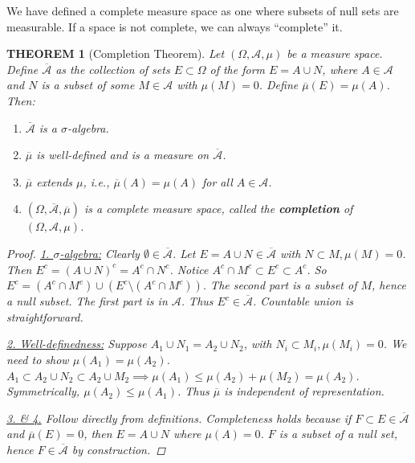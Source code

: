 \documentclass[12pt]{article}
\theoremstyle{blueplain}
\newtheorem{theorem}{THEOREM}[section]
\theoremstyle{bluedef}
\theoremstyle{blueremark}
\numberwithin{equation}{section}
\begin{document}
We have defined a complete measure space as one where subsets of null sets are measurable. If a space is not complete, we can always ``complete'' it.

\begin{theorem}[Completion Theorem]
  Let $(\Omega, \mathcal{A}, \mu)$ be a measure space. Define $\overline{\mathcal{A}}$ as the collection of sets $E \subset \Omega$ of the form $E = A \cup N$, where $A \in \mathcal{A}$ and $N$ is a subset of some $M \in \mathcal{A}$ with $\mu(M) = 0$.
  Define $\overline{\mu}(E) = \mu(A)$.
  Then:
  \begin{enumerate}
    \item $\overline{\mathcal{A}}$ is a $\sigma$-algebra.
    \item $\overline{\mu}$ is well-defined and is a measure on $\overline{\mathcal{A}}$.
    \item $\overline{\mu}$ extends $\mu$, i.e., $\overline{\mu}(A) = \mu(A)$ for all $A \in \mathcal{A}$.
    \item $(\Omega, \overline{\mathcal{A}}, \overline{\mu})$ is a complete measure space, called the \textbf{completion} of $(\Omega, \mathcal{A}, \mu)$.
  \end{enumerate}

  \begin{proof}
    \underline{1. $\sigma$-algebra:}
    Clearly $\emptyset \in \overline{\mathcal{A}}$.
    Let $E = A \cup N \in \overline{\mathcal{A}}$ with $N \subset M, \mu(M)=0$. Then $E^c = (A \cup N)^c = A^c \cap N^c$.
    Notice $A^c \cap M^c \subset E^c \subset A^c$.
    So $E^c = (A^c \cap M^c) \cup (E^c \setminus (A^c \cap M^c))$.
    The second part is a subset of $M$, hence a null subset. The first part is in $\mathcal{A}$. Thus $E^c \in \overline{\mathcal{A}}$.
    Countable union is straightforward.

    \underline{2. Well-definedness:}
    Suppose $A_1 \cup N_1 = A_2 \cup N_2$, with $N_i \subset M_i, \mu(M_i)=0$.
    We need to show $\mu(A_1) = \mu(A_2)$.
    $A_1 \subset A_2 \cup N_2 \subset A_2 \cup M_2 \implies \mu(A_1) \leq \mu(A_2) + \mu(M_2) = \mu(A_2)$.
    Symmetrically, $\mu(A_2) \leq \mu(A_1)$. Thus $\overline{\mu}$ is independent of representation.

    \underline{3. \& 4.} Follow directly from definitions. Completeness holds because if $F \subset E \in \overline{\mathcal{A}}$ and $\overline{\mu}(E)=0$, then $E = A \cup N$ where $\mu(A)=0$. $F$ is a subset of a null set, hence $F \in \overline{\mathcal{A}}$ by construction.
  \end{proof}
\end{theorem}
\end{document}
